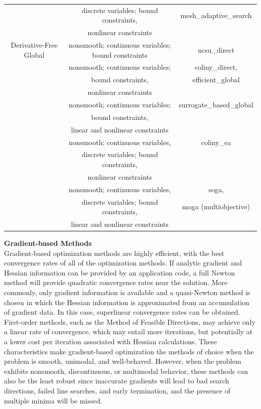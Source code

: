 \begin{table}[hbp]
\begin{tabular}{|c|c|c|}
         & discrete variables; bound constraints, & mesh\_adaptive\_search \\
         & nonlinear constraints &  \\
\hline
Derivative-Free Global & nonsmooth; continuous variables; bound constraints
& ncsu\_direct \\
\hline
         & nonsmooth; continuous variables; & coliny\_direct,  \\
         & bound constraints, & efficient\_global \\
         & nonlinear constraints & \\
\hline
         & nonsmooth; continuous variables; & surrogate\_based\_global \\
         & bound constraints, &  \\
         & linear and nonlinear constraints & \\
\hline
         & nonsmooth; continuous variables, & coliny\_ea \\
         & discrete variables; bound constraints, &  \\
         & nonlinear constraints & \\
\hline
         & nonsmooth; continuous variables, & soga, \\
         & discrete variables; bound constraints, & moga (multiobjective) \\
         & linear and nonlinear constraints & \\
\hline
\end{tabular}
\end{table}

{\bf Gradient-based Methods} \\
Gradient-based optimization methods are highly efficient, with the
best convergence rates of all of the optimization methods. If analytic
gradient and Hessian information can be provided by an application
code, a full Newton method will provide quadratic convergence rates
near the solution. More commonly, only gradient information is
available and a quasi-Newton method is chosen in which the Hessian
information is approximated from an accumulation of gradient data. In
this case, superlinear convergence rates can be obtained. First-order
methods, such as the Method of Feasible Directions, may achieve only
a linear rate of convergence, which may entail more iterations, 
but potentially at a lower cost per iteration associated with 
Hessian calculations. These characteristics make gradient-based optimization
the methods of choice when the problem is smooth, unimodal, and
well-behaved. However, when the problem exhibits nonsmooth,
discontinuous, or multimodal behavior, these methods can also be the
least robust since inaccurate gradients will lead to bad search
directions, failed line searches, and early termination, and the
presence of multiple minima will be missed.

